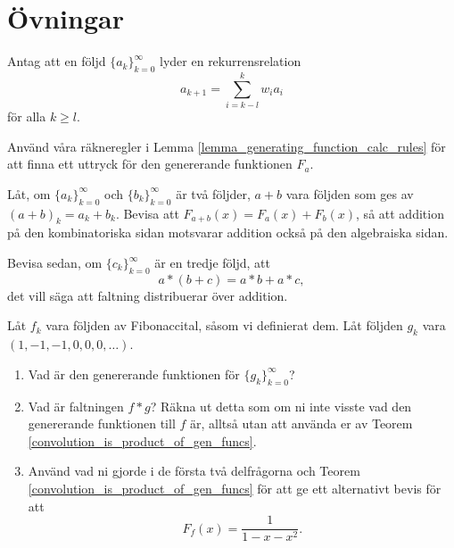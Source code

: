 \documentclass[nobib]{tufte-handout}
\begin{document}
\section{Övningar}

\begin{xca}
    Antag att en följd $\{a_k\}_{k=0}^\infty$ lyder en rekurrensrelation
    $$a_{k+1} = \sum_{i = k - l}^{k} w_i a_i$$
    för alla $k \geq l$.

    Använd våra räkneregler i Lemma \ref{lemma_generating_function_calc_rules} för att finna ett uttryck för den genererande funktionen $F_a$.
\end{xca}

\begin{xca}
    Låt, om $\{a_k\}_{k=0}^\infty$ och $\{b_k\}_{k=0}^\infty$ är två följder, $a+b$ vara följden som ges av $(a+b)_k = a_k + b_k$. Bevisa att $F_{a+b}(x) = F_a(x) + F_b(x)$, så att addition på den kombinatoriska sidan motsvarar addition också på den algebraiska sidan.
    
    Bevisa sedan, om $\{c_k\}_{k=0}^\infty$ är en tredje följd, att
    $$a*(b + c) = a*b + a*c,$$
    det vill säga att faltning distribuerar över addition.
\end{xca}

\begin{xca}
    Låt $f_k$ vara följden av Fibonaccital, såsom vi definierat dem. Låt följden $g_k$ vara $(1, -1, -1, 0, 0, 0,\ldots)$.

    \begin{enumerate}
        \item Vad är den genererande funktionen för $\{g_k\}_{k=0}^\infty$?
        \item Vad är faltningen $f * g$? Räkna ut detta som om ni inte visste vad den genererande funktionen till $f$ är, alltså utan att använda er av Teorem \ref{convolution_is_product_of_gen_funcs}.
        \item Använd vad ni gjorde i de första två delfrågorna och Teorem \ref{convolution_is_product_of_gen_funcs} för att ge ett alternativt bevis för att
        $$F_f(x) = \frac{1}{1 - x - x^2}.$$
    \end{enumerate}
\end{xca}
\end{document}
